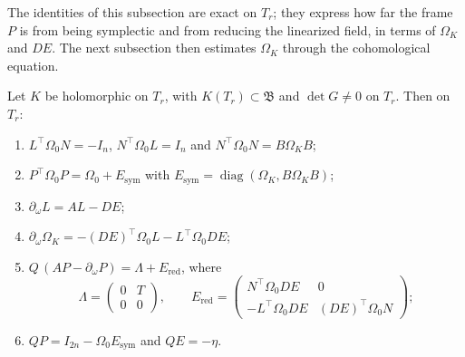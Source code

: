 The identities of this subsection are exact on $T_r$; they express how far the frame $P$ is from being
symplectic and from reducing the linearized field, in terms of $\Omega_K$ and $DE$. The next
subsection then estimates $\Omega_K$ through the cohomological equation.

\begin{lemma}\label{bp:p2:frame-identities}
Let $K$ be holomorphic on $T_r$, with $K(T_r)\subset\mathfrak B$ and $\det G\ne0$ on $T_r$. Then on
$T_r$:
\begin{enumerate}[label=(\alph*)]
\item $L^\top\Omega_0N=-I_n$, $N^\top\Omega_0L=I_n$ and $N^\top\Omega_0N=B\Omega_KB$;
\item $P^\top\Omega_0P=\Omega_0+E_{\mathrm{sym}}$ with $E_{\mathrm{sym}}=\operatorname{diag}(\Omega_K,
  B\Omega_KB)$;
\item $\partial_\omega L=AL-DE$;
\item $\partial_\omega\Omega_K=-(DE)^\top\Omega_0L-L^\top\Omega_0DE$;
\item $Q\,(AP-\partial_\omega P)=\Lambda+E_{\mathrm{red}}$, where
  \[
  \Lambda=\begin{pmatrix}0&T\\0&0\end{pmatrix},\qquad
  E_{\mathrm{red}}=\begin{pmatrix}N^\top\Omega_0DE&0\\-L^\top\Omega_0DE&(DE)^\top\Omega_0N\end{pmatrix};
  \]
\item $QP=I_{2n}-\Omega_0E_{\mathrm{sym}}$ and $QE=-\eta$.
\end{enumerate}
\end{lemma}

